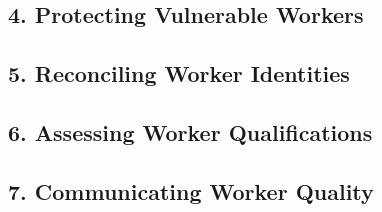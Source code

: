 \subsection{4.        Protecting Vulnerable Workers}

\subsection{5.        Reconciling Worker Identities}

\subsection{6.        Assessing Worker Qualifications}

\subsection{7.        Communicating Worker Quality}

